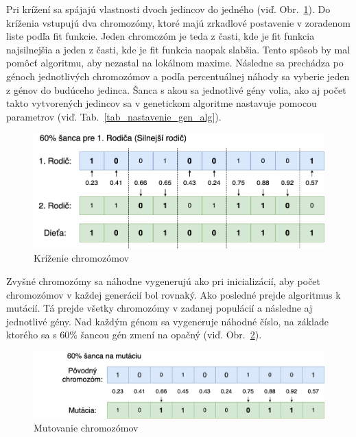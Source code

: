 \documentclass[runningheads]{llncs}
\begin{document}
Pri krížení sa spájajú vlastnosti dvoch jedincov do jedného (viď. Obr.~\ref{fig_ga_krizenie}).
Do kríženia vstupujú dva chromozómy, ktoré majú zrkadlové postavenie v zoradenom liste podľa fit funkcie. 
Jeden chromozóm je teda z časti, kde je fit funkcia najsilnejšia a jeden z časti, kde je fit funkcia naopak slabšia. 
Tento spôsob by mal pomôcť algoritmu, aby nezastal na lokálnom maxime. Následne sa prechádza po génoch 
jednotlivých chromozómov a podľa percentuálnej náhody sa vyberie jeden z génov do budúceho jedinca.
Šanca s akou sa jednotlivé gény volia, ako aj počet takto vytvorených jedincov sa v genetickom algoritme
nastavuje pomocou parametrov (viď. Tab.~\ref{tab_nastavenie_gen_alg}). 

\begin{figure}
\includegraphics[width=\textwidth]{image/krizenie.png}
\caption{Kríženie chromozómov} \label{fig_ga_krizenie}
\end{figure}

Zvyšné chromozómy sa náhodne vygenerujú ako pri inicializácií, aby počet chromozómov v každej generácií bol rovnaký. 
Ako posledné prejde algoritmus k mutácií. Tá prejde všetky chromozómy v zadanej populácií a následne aj jednotlivé gény.
Nad každým génom sa vygeneruje náhodné číslo, na základe ktorého sa s 60\% šancou gén zmení na opačný (viď. Obr.~\ref{fig_ga_mutovanie}). 

\begin{figure}
\includegraphics[width=\textwidth]{image/mutacia.png}
\caption{Mutovanie chromozómov} \label{fig_ga_mutovanie}
\end{figure}

\end{document}
